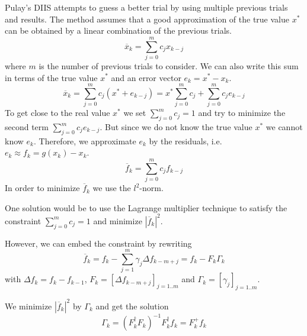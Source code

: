 Pulay's DIIS attempts to guess a better trial by using multiple previous trials and results. The method assumes that a good approximation of the true value \(x^\ast\) can be obtained by a linear combination of the previous trials.
\begin{equation} \label{eq:diis_x}
\overline{x}_{k} = \sum_{j=0}^{m} c_j x_{k-j}
\end{equation}
where \(m\) is the number of previous trials to consider. We can also write this sum in terms of the true value \(x^\ast\) and an error vector \(e_{k} = x^\ast - x_{k}\).
\[\overline{x}_{k} = \sum_{j=0}^{m} c_j (x^\ast + e_{k-j}) = x^\ast \sum_{j=0}^{m} c_j + \sum_{j=0}^{m} c_j e_{k-j}\]
To get close to the real value \(x^\ast\) we set \(\sum_{j=0}^{m} c_j = 1\) and try to minimize the second term \(\sum_{j=0}^{m} c_j e_{k-j}\). But since we do not know the true value \(x^\ast\) we cannot know \(e_{k}\). Therefore, we approximate \(e_{k}\) by the residuals, i.e. \(e_{k} \approx f_{k} = g(x_k) - x_k\).
\[\overline{f}_{k} = \sum_{j=0}^{m} c_j f_{k-j}\]
In order to minimize \(\overline{f}_{k}\) we use the \(l^2\)-norm.

One solution would be to use the Lagrange multiplier technique to satisfy the constraint \(\sum_{j=0}^{m} c_j = 1\) and minimize \(|\overline{f}_{k}|^2\).

However, we can embed the constraint by rewriting \footnotemark
\begin{equation} \label{eq:diis_f}
\overline{f}_{k} = f_k - \sum_{j=1}^{m} \gamma_j {\Delta f}_{k-m+j} = f_k - F_k \Gamma_k
\end{equation}
with \({\Delta f}_{k} = f_k - f_{k-1}\), \(F_k = [{\Delta f}_{k-m+j}]_{j=1..m}\) and \(\Gamma_k = [\gamma_j]_{j=1..m}\).


We minimize \(|\overline{f}_{k}|^2\) by \(\Gamma_k\) and get the solution \footnotemark
\begin{equation} \label{eq:diis_gamma}
\Gamma_k = (F_k^\dagger F_k)^{-1} F_k^\dagger f_k = F_k^+ f_k
\end{equation}


